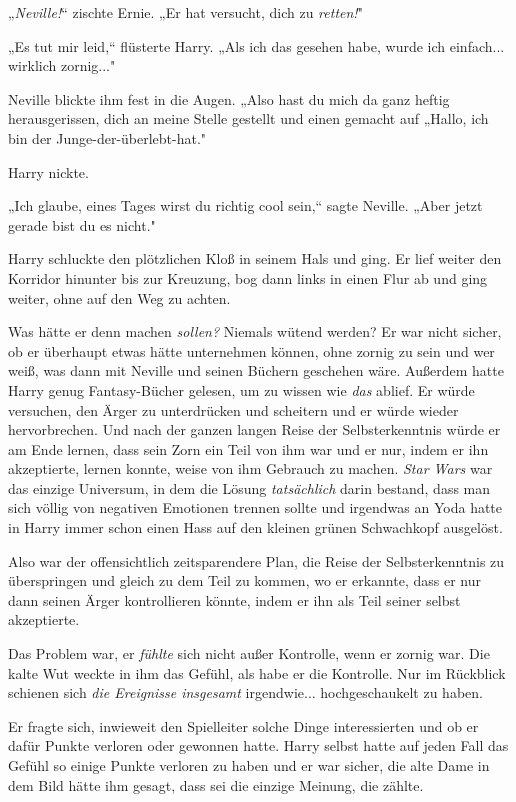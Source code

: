 {„\emph{Neville!}“ zischte Ernie. „Er hat versucht, dich zu \emph{retten!}"

„Es tut mir leid,“ flüsterte Harry. „Als ich das gesehen habe, wurde ich einfach... wirklich zornig..."

Neville blickte ihm fest in die Augen. „Also hast du mich da ganz heftig herausgerissen, dich an meine Stelle gestellt und einen gemacht auf „Hallo, ich bin der Junge-der-überlebt-hat."

Harry nickte.

„Ich glaube, eines Tages wirst du richtig cool sein,“ sagte Neville. „Aber jetzt gerade bist du es nicht."

Harry schluckte den plötzlichen Kloß in seinem Hals und ging. Er lief weiter den Korridor hinunter bis zur Kreuzung, bog dann links in einen Flur ab und ging weiter, ohne auf den Weg zu achten.

Was hätte er denn machen \emph{sollen?} Niemals wütend werden? Er war nicht sicher, ob er überhaupt etwas hätte unternehmen können, ohne zornig zu sein und wer weiß, was dann mit Neville und seinen Büchern geschehen wäre. Außerdem hatte Harry genug Fantasy-Bücher gelesen, um zu wissen wie \emph{das} ablief. Er würde versuchen, den Ärger zu unterdrücken und scheitern und er würde wieder hervorbrechen. Und nach der ganzen langen Reise der Selbsterkenntnis würde er am Ende lernen, dass sein Zorn ein Teil von ihm war und er nur, indem er ihn akzeptierte, lernen konnte, weise von ihm Gebrauch zu machen. \emph{Star Wars} war das einzige Universum, in dem die Lösung \emph{tatsächlich} darin bestand, dass man sich völlig von negativen Emotionen trennen sollte und irgendwas an Yoda hatte in Harry immer schon einen Hass auf den kleinen grünen Schwachkopf ausgelöst.

Also war der offensichtlich zeitsparendere Plan, die Reise der Selbsterkenntnis zu überspringen und gleich zu dem Teil zu kommen, wo er erkannte, dass er nur dann seinen Ärger kontrollieren könnte, indem er ihn als Teil seiner selbst akzeptierte.

Das Problem war, er \emph{fühlte} sich nicht außer Kontrolle, wenn er zornig war. Die kalte Wut weckte in ihm das Gefühl, als habe er die Kontrolle. Nur im Rückblick schienen sich \emph{die Ereignisse insgesamt} irgendwie... hochgeschaukelt zu haben.

Er fragte sich, inwieweit den Spielleiter solche Dinge interessierten und ob er dafür Punkte verloren oder gewonnen hatte. Harry selbst hatte auf jeden Fall das Gefühl so einige Punkte verloren zu haben und er war sicher, die alte Dame in dem Bild hätte ihm gesagt, dass sei die einzige Meinung, die zählte.

}
